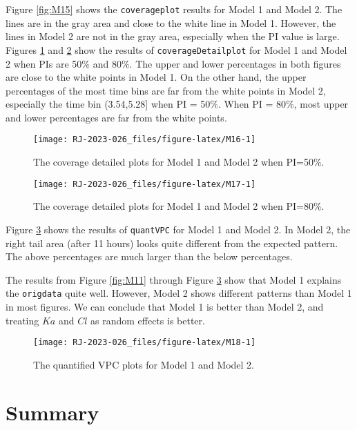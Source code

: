 Figure \ref{fig:M15} shows the \texttt{coverageplot} results for Model 1 and Model 2. The lines are in the gray area and close to the white line in Model 1. However, the lines in Model 2 are not in the gray area, especially when the PI value is large. Figures \ref{fig:M16} and \ref{fig:M17} show the results of \texttt{coverageDetailplot} for Model 1 and Model 2 when PIs are 50\(\%\) and 80\(\%\).
The upper and lower percentages in both figures are close to the white points in Model 1. On the other hand, the upper percentages of the most time bins are far from the white points in Model 2, especially the time bin (3.54,5.28{]} when PI = 50\(\%\). When PI = 80\(\%\), most upper and lower percentages are far from the white points.

\begin{figure}
\texttt{[image: RJ-2023-026\_files/figure-latex/M16-1]} \caption{The coverage detailed plots for Model 1 and Model 2 when PI=50\%.}\label{fig:M16}
\end{figure}

\begin{figure}
\texttt{[image: RJ-2023-026\_files/figure-latex/M17-1]} \caption{The coverage detailed plots for Model 1 and Model 2 when PI=80\%.}\label{fig:M17}
\end{figure}

Figure \ref{fig:M18} shows the results of \texttt{quantVPC} for Model 1 and Model 2. In Model 2, the right tail area (after 11 hours) looks quite different from the expected pattern. The above percentages are much larger than the below percentages.

The results from Figure \ref{fig:M11} through Figure \ref{fig:M18} show that Model 1 explains the \texttt{origdata} quite well. However, Model 2 shows different patterns than Model 1 in most figures. We can conclude that Model 1 is better than Model 2, and treating \(Ka\) and \(Cl\) as random effects is better.

\begin{figure}
\texttt{[image: RJ-2023-026\_files/figure-latex/M18-1]} \caption{The quantified VPC plots for Model 1 and Model 2.}\label{fig:M18}
\end{figure}

\hypertarget{summary}{%
\section{Summary}\label{summary}}

